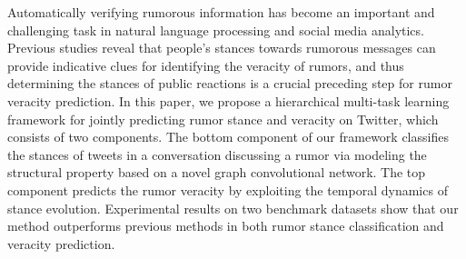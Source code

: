 Automatically verifying rumorous information has become an important and challenging task in natural language processing and social media analytics. Previous studies reveal that people's stances towards rumorous messages can provide indicative clues for identifying the veracity of rumors, and thus determining the stances of public reactions is a crucial preceding step for rumor veracity prediction. In this paper, we propose a hierarchical multi-task learning framework for jointly predicting rumor stance and veracity on Twitter, which consists of two components. The bottom component of our framework classifies the stances of tweets in a conversation discussing a rumor via modeling the structural property based on a novel graph convolutional network. The top component predicts the rumor veracity by exploiting the temporal dynamics of stance evolution. Experimental results on two benchmark datasets show that our method outperforms previous methods in both rumor stance classification and veracity prediction.